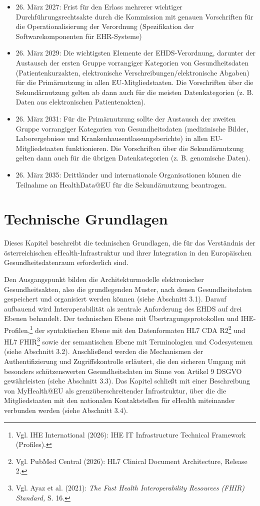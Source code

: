 \begin{itemize}
    \item 26. März 2027: Frist für den Erlass mehrerer wichtiger Durchführungsrechtsakte durch die Kommission mit genauen Vorschriften für die Operationalisierung der Verordnung (Spezifikation der Softwarekomponenten für EHR-Systeme)
    \item 26. März 2029: Die wichtigsten Elemente der EHDS-Verordnung, darunter der Austausch der ersten Gruppe vorrangiger Kategorien von Gesundheitsdaten (Patientenkurzakten, elektronische Verschreibungen/elektronische Abgaben) für die Primärnutzung in allen EU-Mitgliedstaaten. Die Vorschriften über die Sekundärnutzung gelten ab dann auch für die meisten Datenkategorien (z. B. Daten aus elektronischen Patientenakten).
    \item 26. März 2031: Für die Primärnutzung sollte der Austausch der zweiten Gruppe vorrangiger Kategorien von Gesundheitsdaten (medizinische Bilder, Laborergebnisse und Krankenhausentlassungsberichte) in allen EU-Mitgliedstaaten funktionieren. Die Vorschriften über die Sekundärnutzung gelten dann auch für die übrigen Datenkategorien (z. B. genomische Daten).
    \item 26. März 2035: Drittländer und internationale Organisationen können die Teilnahme an HealthData@EU für die Sekundärnutzung beantragen.
\end{itemize}
\chapter{Technische Grundlagen}
Dieses Kapitel beschreibt die technischen Grundlagen, die für das Verständnis der österreichischen eHealth-Infrastruktur und ihrer Integration in den Europäischen Gesundheitsdatenraum erforderlich sind.

Den Ausgangspunkt bilden die Architekturmodelle elektronischer Gesundheitsakten, also die grundlegenden Muster, nach denen Gesundheitsdaten gespeichert und organisiert werden können (siehe Abschnitt 3.1). Darauf aufbauend wird Interoperabilität als zentrale Anforderung des EHDS auf drei Ebenen behandelt. Der technischen Ebene mit Übertragungsprotokollen und IHE-Profilen,\footnote{Vgl. IHE International (2026): IHE IT Infrastructure Technical Framework (Profiles).}
der syntaktischen Ebene mit den Datenformaten HL7 CDA R2\footnote{Vgl. PubMed Central (2026): HL7 Clinical Document Architecture, Release 2.} und
HL7 FHIR\footnote{Vgl. Ayaz et al. (2021): \textit{The Fast Health Interoperability Resources (FHIR) Standard,} S. 16.} sowie
der semantischen Ebene mit Terminologien und Codesystemen (siehe Abschnitt 3.2). Anschließend werden die Mechanismen der Authentifizierung und Zugriffskontrolle erläutert, die den sicheren Umgang mit besonders schützenswerten Gesundheitsdaten im Sinne von Artikel 9 DSGVO gewährleisten (siehe Abschnitt 3.3). Das Kapitel schließt mit einer Beschreibung von MyHealth@EU als grenzüberschreitender Infrastruktur, über die die Mitgliedstaaten mit den nationalen Kontaktstellen für eHealth miteinander verbunden werden (siehe Abschnitt 3.4).

